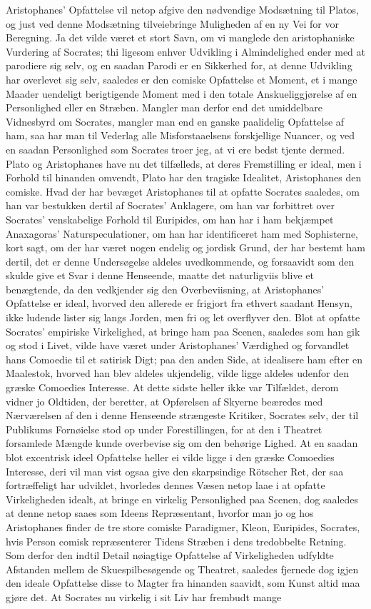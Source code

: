 \documentclass[12pt,a4paper]{article}
\begin{document}
Aristophanes' Opfattelse vil netop afgive den nødvendige Modsætning til Platos, og just ved denne Modsætning tilveiebringe Muligheden af en ny Vei for vor Beregning. Ja det vilde været et stort Savn, om vi manglede den aristophaniske Vurdering af Socrates; thi ligesom enhver Udvikling i Almindelighed ender med at parodiere sig selv, og en saadan Parodi er en Sikkerhed for, at denne Udvikling har overlevet sig selv, saaledes er den comiske Opfattelse et Moment, et i mange Maader uendeligt berigtigende Moment med i den totale Anskueliggjørelse af en Personlighed eller en Stræben. Mangler man derfor end det umiddelbare Vidnesbyrd om Socrates, mangler man end en ganske paalidelig Opfattelse af ham, saa har man til Vederlag alle Misforstaaelsens forskjellige Nuancer, og ved en saadan Personlighed som Socrates troer jeg, at vi ere bedst tjente dermed. Plato og Aristophanes have nu det tilfælleds, at deres Fremstilling er ideal, men i Forhold til hinanden omvendt, Plato har den tragiske Idealitet, Aristophanes den comiske. Hvad der har bevæget Aristophanes til at opfatte Socrates saaledes, om han var bestukken dertil af Socrates' Anklagere, om han var forbittret over Socrates' venskabelige Forhold til Euripides, om han har i ham bekjæmpet Anaxagoras' Naturspeculationer, om han har identificeret ham med Sophisterne, kort sagt, om der har været nogen endelig og jordisk Grund, der har bestemt ham dertil, det er denne Undersøgelse aldeles uvedkommende, og forsaavidt som den skulde give et Svar i denne Henseende, maatte det naturligviis blive et benægtende, da den vedkjender sig den Overbeviisning, at Aristophanes' Opfattelse er ideal, hvorved den allerede er frigjort fra ethvert saadant Hensyn, ikke ludende lister sig langs Jorden, men fri og let overflyver den. Blot at opfatte Socrates' empiriske Virkelighed, at bringe ham paa Scenen, saaledes som han gik og stod i Livet, vilde have været under Aristophanes' Værdighed og forvandlet hans Comoedie til et satirisk Digt; paa den anden Side, at idealisere ham efter en Maalestok, hvorved han blev aldeles ukjendelig, vilde ligge aldeles udenfor den græske Comoedies Interesse. At dette sidste heller ikke var Tilfældet, derom vidner jo Oldtiden, der beretter, at Opførelsen af Skyerne beæredes med Nærværelsen af den i denne Henseende strængeste Kritiker, Socrates selv, der til Publikums Fornøielse stod op under Forestillingen, for at den i Theatret forsamlede Mængde kunde overbevise sig om den behørige Lighed. At en saadan blot excentrisk ideel Opfattelse heller ei vilde ligge i den græske Comoedies Interesse, deri vil man vist ogsaa give den skarpsindige Rötscher Ret, der saa fortræffeligt har udviklet, hvorledes dennes Væsen netop laae i at opfatte Virkeligheden idealt, at bringe en virkelig Personlighed paa Scenen, dog saaledes at denne netop saaes som Ideens Repræsentant, hvorfor man jo og hos Aristophanes finder de tre store comiske Paradigmer, Kleon, Euripides, Socrates, hvis Person comisk repræsenterer Tidens Stræben i dens tredobbelte Retning. Som derfor den indtil Detail nøiagtige Opfattelse af Virkeligheden udfyldte Afstanden mellem de Skuespilbesøgende og Theatret, saaledes fjernede dog igjen den ideale Opfattelse disse to Magter fra hinanden saavidt, som Kunst altid maa gjøre det. At Socrates nu virkelig i sit Liv har frembudt mange 
\end{document}
